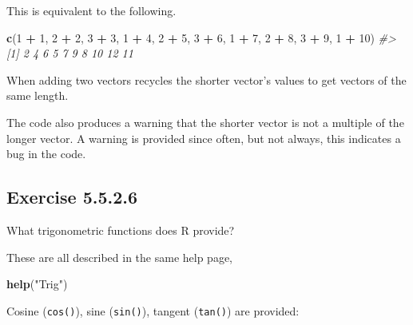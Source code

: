 \documentclass[]{book}
\newenvironment{Shaded}{\begin{snugshade}}{\end{snugshade}}
\newcommand{\CommentTok}[1]{\textcolor[rgb]{0.56,0.35,0.01}{\textit{#1}}}
\newcommand{\DecValTok}[1]{\textcolor[rgb]{0.00,0.00,0.81}{#1}}
\newcommand{\KeywordTok}[1]{\textcolor[rgb]{0.13,0.29,0.53}{\textbf{#1}}}
\newcommand{\NormalTok}[1]{#1}
\newcommand{\OperatorTok}[1]{\textcolor[rgb]{0.81,0.36,0.00}{\textbf{#1}}}
\newcommand{\StringTok}[1]{\textcolor[rgb]{0.31,0.60,0.02}{#1}}
\theoremstyle{plain}
\theoremstyle{remark}
\begin{document}
This is equivalent to the following.

\begin{Shaded}
\begin{Highlighting}[]
\KeywordTok{c}\NormalTok{(}\DecValTok{1} \OperatorTok{+}\StringTok{ }\DecValTok{1}\NormalTok{, }\DecValTok{2} \OperatorTok{+}\StringTok{ }\DecValTok{2}\NormalTok{, }\DecValTok{3} \OperatorTok{+}\StringTok{ }\DecValTok{3}\NormalTok{, }\DecValTok{1} \OperatorTok{+}\StringTok{ }\DecValTok{4}\NormalTok{, }\DecValTok{2} \OperatorTok{+}\StringTok{ }\DecValTok{5}\NormalTok{, }\DecValTok{3} \OperatorTok{+}\StringTok{ }\DecValTok{6}\NormalTok{, }\DecValTok{1} \OperatorTok{+}\StringTok{ }\DecValTok{7}\NormalTok{, }\DecValTok{2} \OperatorTok{+}\StringTok{ }\DecValTok{8}\NormalTok{, }\DecValTok{3} \OperatorTok{+}\StringTok{ }\DecValTok{9}\NormalTok{, }\DecValTok{1} \OperatorTok{+}\StringTok{ }\DecValTok{10}\NormalTok{)}
\CommentTok{#>  [1]  2  4  6  5  7  9  8 10 12 11}
\end{Highlighting}
\end{Shaded}

When adding two vectors recycles the shorter vector's values to get vectors of the same length.

The code also produces a warning that the shorter vector is not a multiple of the longer vector.
A warning is provided since often, but not always, this indicates a bug in the code.

\hypertarget{exercise-5.5.2.6}{%
\subsection*{\texorpdfstring{Exercise {5.5.2.6}}{Exercise 5.5.2.6}}\label{exercise-5.5.2.6}}

What trigonometric functions does R provide?

These are all described in the same help page,

\begin{Shaded}
\begin{Highlighting}[]
\KeywordTok{help}\NormalTok{(}\StringTok{"Trig"}\NormalTok{)}
\end{Highlighting}
\end{Shaded}

Cosine (\texttt{cos()}), sine (\texttt{sin()}), tangent (\texttt{tan()}) are provided:
\end{document}
